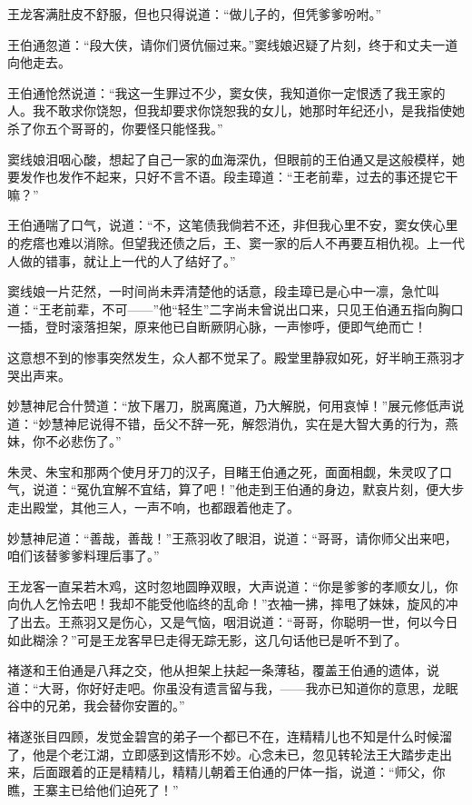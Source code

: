 \documentclass[12pt,oneside]{book}
\begin{document}
王龙客满肚皮不舒服，但也只得说道：``做儿子的，但凭爹爹吩咐。''

王伯通忽道：``段大侠，请你们贤伉俪过来。''窦线娘迟疑了片刻，终于和丈夫一道向他走去。

王伯通怆然说道：``我这一生罪过不少，窦女侠，我知道你一定恨透了我王家的人。我不敢求你饶恕，但我却要求你饶恕我的女儿，她那时年纪还小，是我指使她杀了你五个哥哥的，你要怪只能怪我。''

窦线娘泪咽心酸，想起了自己一家的血海深仇，但眼前的王伯通又是这般模样，她要发作也发作不起来，只好不言不语。段圭璋道：``王老前辈，过去的事还提它干嘛？''

王伯通喘了口气，说道：``不，这笔债我倘若不还，非但我心里不安，窦女侠心里的疙瘩也难以消除。但望我还债之后，王、窦一家的后人不再要互相仇视。上一代人做的错事，就让上一代的人了结好了。''

窦线娘一片茫然，一时间尚未弄清楚他的话意，段圭璋已是心中一凛，急忙叫道：``王老前辈，不可------''他``轻生''二字尚未曾说出口来，只见王伯通五指向胸口一插，登时滚落担架，原来他已自断厥阴心脉，一声惨呼，便即气绝而亡！

这意想不到的惨事突然发生，众人都不觉呆了。殿堂里静寂如死，好半晌王燕羽才哭出声来。

妙慧神尼合什赞道：``放下屠刀，脱离魔道，乃大解脱，何用哀悼！''展元修低声说道：``妙慧神尼说得不错，岳父不辞一死，解怨消仇，实在是大智大勇的行为，燕妹，你不必悲伤了。''

朱灵、朱宝和那两个使月牙刀的汉子，目睹王伯通之死，面面相觑，朱灵叹了口气，说道：``冤仇宜解不宜结，算了吧！''他走到王伯通的身边，默哀片刻，便大步走出殿堂，其他三人，一声不响，也都跟着他走了。

妙慧神尼道：``善哉，善哉！''王燕羽收了眼泪，说道：``哥哥，请你师父出来吧，咱们该替爹爹料理后事了。''

王龙客一直呆若木鸡，这时忽地圆睁双眼，大声说道：``你是爹爹的孝顺女儿，你向仇人乞怜去吧！我却不能受他临终的乱命！''衣袖一拂，摔甩了妹妹，旋风的冲了出去。王燕羽又是伤心，又是气恼，咽泪说道：``哥哥，你聪明一世，何以今日如此糊涂？''可是王龙客早巳走得无踪无影，这几句话他已是听不到了。

褚遂和王伯通是八拜之交，他从担架上扶起一条薄毡，覆盖王伯通的遗体，说道：``大哥，你好好走吧。你虽没有遗言留与我，------我亦已知道你的意思，龙眠谷中的兄弟，我会替你安置的。''

褚遂张目四顾，发觉金碧宫的弟子一个都已不在，连精精儿也不知是什么时候溜了，他是个老江湖，立即感到这情形不妙。心念未已，忽见转轮法王大踏步走出来，后面跟着的正是精精儿，精精儿朝着王伯通的尸体一指，说道：``师父，你瞧，王寨主已给他们迫死了！''
\end{document}
